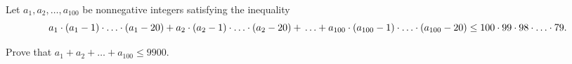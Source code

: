 Let $ a_1,a_{2},\ldots ,a_{100}$ be nonnegative integers satisfying the inequality\[a_1\cdot (a_1-1)\cdot\ldots\cdot (a_1-20)+a_2\cdot (a_2-1)\cdot\ldots\cdot (a_2-20)+\\ \ldots+a_{100}\cdot (a_{100}-1)\cdot\ldots\cdot (a_{100}-20)\le 100\cdot 99\cdot 98\cdot\ldots\cdot 79.\]

Prove that $a_1+a_2+\ldots+a_{100}\le 9900$.